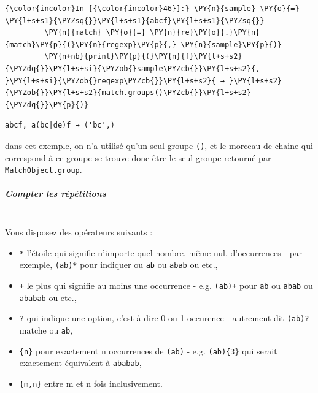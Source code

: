     \begin{Verbatim}[commandchars=\\\{\}]
{\color{incolor}In [{\color{incolor}46}]:} \PY{n}{sample} \PY{o}{=} \PY{l+s+s1}{\PYZsq{}}\PY{l+s+s1}{abcf}\PY{l+s+s1}{\PYZsq{}}
         \PY{n}{match} \PY{o}{=} \PY{n}{re}\PY{o}{.}\PY{n}{match}\PY{p}{(}\PY{n}{regexp}\PY{p}{,} \PY{n}{sample}\PY{p}{)}
         \PY{n+nb}{print}\PY{p}{(}\PY{n}{f}\PY{l+s+s2}{\PYZdq{}}\PY{l+s+si}{\PYZob{}sample\PYZcb{}}\PY{l+s+s2}{, }\PY{l+s+si}{\PYZob{}regexp\PYZcb{}}\PY{l+s+s2}{ → }\PY{l+s+s2}{\PYZob{}}\PY{l+s+s2}{match.groups()\PYZcb{}}\PY{l+s+s2}{\PYZdq{}}\PY{p}{)}
\end{Verbatim}


    \begin{Verbatim}[commandchars=\\\{\}]
abcf, a(bc|de)f → ('bc',)

    \end{Verbatim}

    dans cet exemple, on n'a utilisé qu'un seul groupe \texttt{()}, et le
morceau de chaine qui correspond à ce groupe se trouve donc être le seul
groupe retourné par \texttt{MatchObject.group}.

    \hypertarget{compter-les-ruxe9puxe9titions}{%
\subparagraph{Compter les
répétitions\\\\}\label{compter-les-ruxe9puxe9titions}}

    Vous disposez des opérateurs suivants :
    \begin{itemize}
    	\item 
	    \texttt{*} l'étoile qui
		signifie n'importe quel nombre, même nul, d'occurrences - par exemple,
		\texttt{(ab)*} pour indiquer
		\texttt{\textquotesingle{}\textquotesingle{}} ou
		\texttt{\textquotesingle{}ab\textquotesingle{}} ou
		\texttt{\textquotesingle{}abab\textquotesingle{}} ou etc.,
		\item
		\texttt{+} le plus qui signifie au moins une occurrence - e.g. \texttt{(ab)+} pour
		\texttt{ab} ou \texttt{abab} ou \texttt{ababab} ou etc.,
		\item
		\texttt{?} qui indique une option, c'est-à-dire 0 ou 1 occurence - autrement dit
		\texttt{(ab)?} matche \texttt{\textquotesingle{}\textquotesingle{}} ou
		\texttt{ab},
		\item
		\texttt{\{n\}} pour exactement n occurrences de
		\texttt{(ab)} - e.g. \texttt{(ab)\{3\}} qui serait exactement équivalent
		à \texttt{ababab},
		\item
		\texttt{\{m,n\}} entre m et n fois inclusivement.
\end{itemize}

